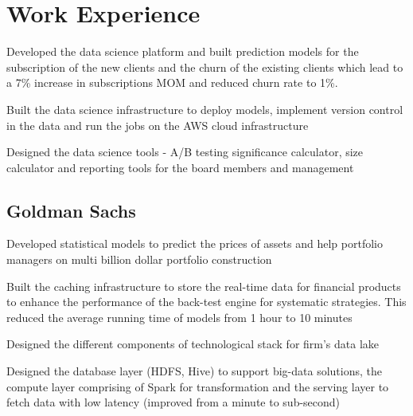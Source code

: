 \documentclass[]{resume-openfont}
\begin{document}
\begin{minipage}[t]{0.66\textwidth} 


\section{Work Experience}

\vspace{\topsep} 
\begin{tightemize}
\item Developed the data science platform and built prediction models for the subscription of the new clients and the churn of the existing clients which lead to a 7\% increase in subscriptions MOM and reduced churn rate to 1\%.
\item Built the data science infrastructure to deploy models, implement version control in the data and run the jobs on the AWS cloud infrastructure
\item Designed the data science tools - A/B testing significance calculator, size calculator and reporting tools for the board members and management 
\end{tightemize}

\subsection{Goldman Sachs}
\begin{tightemize}
\item Developed statistical models to predict the prices of assets and help portfolio managers on multi billion dollar portfolio construction
\item Built the caching infrastructure to store the real-time data for financial products to enhance the performance of the back-test engine for systematic strategies. This reduced the average running time of models from 1 hour to 10 minutes
\end{tightemize}

\begin{tightemize}
\item Designed the different components of technological stack for firm's data lake
\item Designed the database layer (HDFS, Hive) to support big-data solutions, the compute layer comprising of Spark for transformation and the serving layer to fetch data with low latency (improved from a minute to sub-second)
\end{tightemize}
\sectionsep


\end{minipage}
\end{document}
